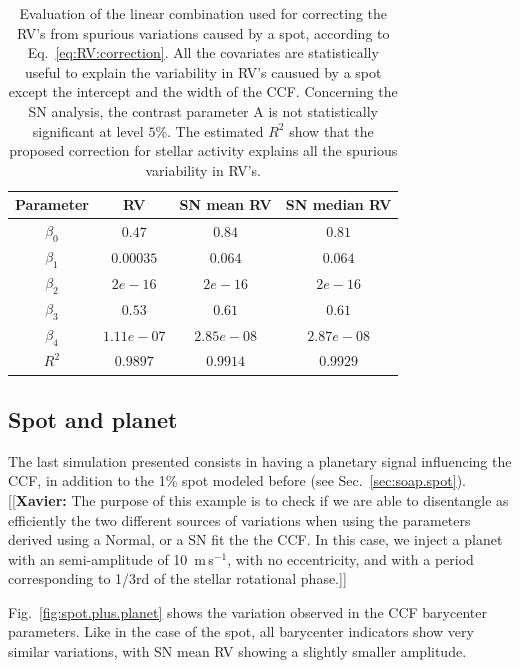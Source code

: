 \documentclass{aa}
\def\ms{\hbox{\,m\,s$^{-1}$}}         %
\newcommand{\xavier}[1]{{\color{blue}[[\textbf{Xavier: }#1]]}}
\begin{document}
\begin{table}
\centering
\begin{tabular}{|c|c|c|c|}
\hline
Parameter          & RV         &   SN mean RV &   SN median RV \\
\hline
$\beta_{0}$            &    $0.47$    & $0.84$ & $0.81$ \\
\hline
$\beta_{1}$            &    $0.00035$    & $0.064$ & $0.064$ \\
\hline
$\beta_{2}$            &     $2e-16$   &  $2e-16$ & $2e-16$\\
\hline
$\beta_{3}$            &     $0.53$   &  $0.61$ & $0.61$\\
\hline
$\beta_{4}$            &     $1.11e-07 $   &  $2.85e-08 $ & $ 2.87e-08 $\\
\hline
$R^{2}$      &     $0.9897$    &  $0.9914$ & $0.9929$  \\
\hline
\end{tabular}
\caption{Evaluation of the linear combination used for correcting the RV's from spurious variations caused by a spot, according to Eq.~\ref{eq:RV:correction}. All the covariates are statistically useful to explain the variability in RV's causued by a spot except the intercept and the width of the CCF. Concerning the SN analysis, the contrast parameter A is not statistically significant at level $5\%$. The estimated $R^{2}$ show that the proposed correction for stellar activity explains all the spurious variability in RV's.}
\label{table:spot.test}
\end{table}

\subsection{Spot and planet} \label{sec:soap.spot.planet}

The last simulation presented consists in having a planetary signal influencing the CCF, in addition to the 1\% spot modeled before (see Sec.~\ref{sec:soap.spot}). \xavier{The purpose of this example is to check if we are able to disentangle as efficiently the two different sources of variations when using the parameters derived using a Normal, or a SN fit the the CCF. In this case, we inject a planet with an semi-amplitude of 10 \ms, with no eccentricity, and with a period corresponding to 1/3rd of the stellar rotational phase.}

Fig.~\ref{fig:spot.plus.planet} shows the variation observed in the CCF barycenter parameters. Like in the case of the spot, all barycenter indicators show very similar variations, with SN mean RV showing a slightly smaller amplitude.
\end{document}
